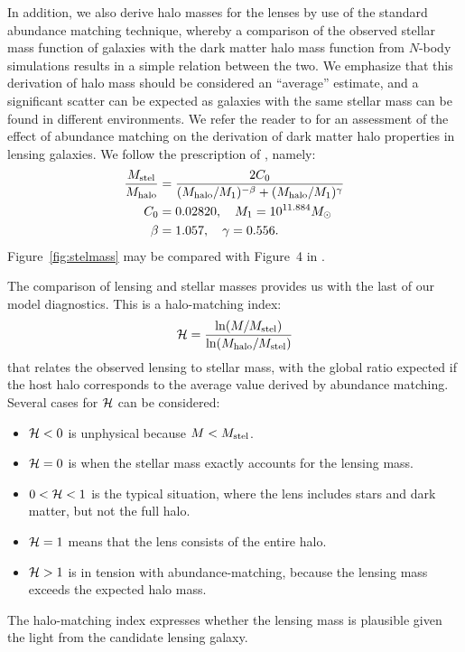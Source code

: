 In addition, we also derive halo masses for the lenses by use of the
standard abundance matching technique, whereby a comparison of the
observed stellar mass function of galaxies with the dark matter halo
mass function from $N$-body simulations results in a simple relation
between the two. We emphasize that this derivation of halo mass should
be considered an ``average'' estimate, and a significant scatter can
be expected as galaxies with the same stellar mass can be found in
different environments. We refer the reader to \cite{2012MNRAS.424..104L}
for an assessment of the effect of abundance matching on the
derivation of dark matter halo properties in lensing galaxies. We
follow the prescription of \citet{2010ApJ...710..903M}, namely:
\begin{equation}
\begin{aligned}
\frac{M_\text{stel}}{M_\text{halo}} &= \frac{2C_0}{(M_\text{halo}/M_1)^{-\beta} +
                                     (M_\text{halo}/M_1)^\gamma} \\
C_0 &= 0.02820, \quad M_1 = 10^{11.884} M_\odot \\
\beta &= 1.057, \quad \gamma = 0.556.
\end{aligned}
\end{equation}
Figure~\ref{fig:stelmass} may be compared with Figure~4 in
\cite{2011ApJ...734...69M}.

The comparison of lensing and stellar masses provides us with the last
of our model diagnostics.  This is a halo-matching index:
\begin{equation}
\mathcal{H} = \frac{\ln(M/M_\text{stel})}{\ln(M_\text{halo}/M_\text{stel})}
\end{equation}
that relates the observed lensing to stellar mass, with the
global ratio expected if the host halo corresponds to the
average value derived by abundance matching. Several cases
for $\mathcal{H}$ can be considered:
\begin{itemize}
\item $\mathcal{H} < 0$ is unphysical because $M<M_\text{stel}$.
\item $\mathcal{H} = 0$ is when the stellar mass exactly accounts for the
  lensing mass.
\item $0 < \mathcal{H} < 1$ is the typical situation, where the lens
  includes stars and dark matter, but not the full halo.
\item $\mathcal{H} = 1$ means that the lens consists of the entire halo.
\item $\mathcal{H} > 1$ is in tension with abundance-matching, because the
  lensing mass exceeds the expected halo mass.
\end{itemize}
The halo-matching index expresses whether the lensing mass is
plausible given the light from the candidate lensing galaxy.



